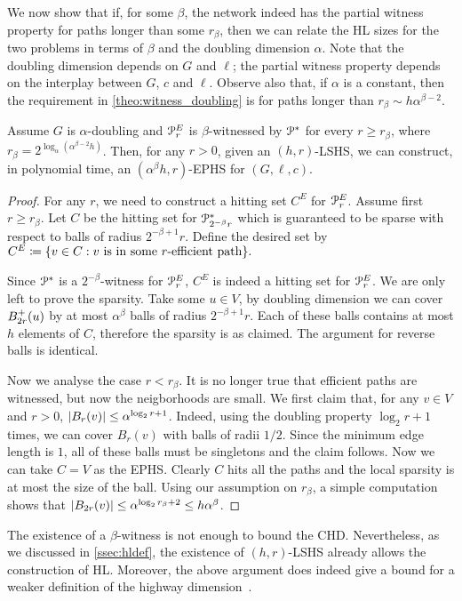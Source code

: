 We now show that if, for some $\beta$, the network indeed has the partial witness property for paths longer than some $r_\beta$, then we can relate the HL sizes for the two problems in terms of $\beta$ and the doubling dimension $\alpha$. 
Note that the doubling dimension depends on $G$ and $\ell$; the partial witness property depends on the interplay between $G$, $c$ and $\ell$.
Observe also that, if $\alpha$ is a constant, then the requirement in \cref{theo:witness_doubling} is for paths longer than $r_\beta\sim h\alpha^{\beta-2}$.
\begin{theorem}\label{theo:witness_doubling}
Assume $G$ is $\alpha$-doubling and $\mathcal{P}^E_r$ is $\beta$-witnessed by $\mathcal{P}^*$ for every $r\geq r_\beta$, where $r_\beta=2^{\log_\alpha(\alpha^{\beta-2} h)}$. 
Then, for any $r>0$, given an $(h,r)$-LSHS, we can construct, in polynomial time, an $(\alpha^{\beta} h,r)$-EPHS for $(G,\ell,c)$.  
\end{theorem}

\begin{proof}
For any $r$, we need to construct a hitting set $C^E$ for $\mathcal{P}^E_r$.
Assume first $r\geq r_\beta$.
Let $C$ be the hitting set for $\mathcal{P}^*_{2^{-\beta}r}$ which is guaranteed to be sparse with respect to balls of radius $2^{-\beta+1}r$.
Define the desired set by
$
C^E\coloneqq\{v\in C: v \text{ is in some $r$-efficient path} \}.
$

Since $\mathcal{P}^*$ is a $2^{-\beta}$-witness for $\mathcal{P}^E_r$, $C^E$ is indeed a hitting set for $\mathcal{P}^E_r$.
We are only left to prove the sparsity.
Take some $u\in V$, by doubling dimension we can cover $B^+_{2r}(u)$ by at most $\alpha^\beta$ balls of radius $2^{-\beta+1}r$.
Each of these balls contains at most $h$ elements of $C$, therefore the sparsity is as claimed.
The argument for reverse balls is identical.

Now we analyse the case $r< r_\beta$.
It is no longer true that efficient paths are witnessed, but now the neigborhoods are small.
We first claim that, for any $v\in V$ and $r>0$, $\lvert B_{r}(v)\rvert\leq \alpha^{\log_2r+1}$.
Indeed, using the doubling property $\log_2r+1$ times, we can cover $B_r(v)$ with balls of radii $1/2$.
Since the minimum edge length is $1$, all of these balls must be singletons and the claim follows.
Now we can take $C=V$ as the EPHS.
Clearly $C$ hits all the paths and the local sparsity is at most the size of the ball.
Using our assumption on $r_\beta$, a simple computation shows that $\lvert B_{2r}(v)\rvert\leq \alpha^{\log_2r_\beta+2}\leq h\alpha^\beta$. 
\end{proof}
\begin{remark}
The existence of a $\beta$-witness is not enough to bound the CHD. 
Nevertheless, as we discussed in \cref{ssec:hldef}, the existence of $(h,r)$-LSHS already allows the construction of HL. Moreover, the above argument does indeed give a bound for a weaker definition of the highway dimension~\cite{highway2010}.
\end{remark}
